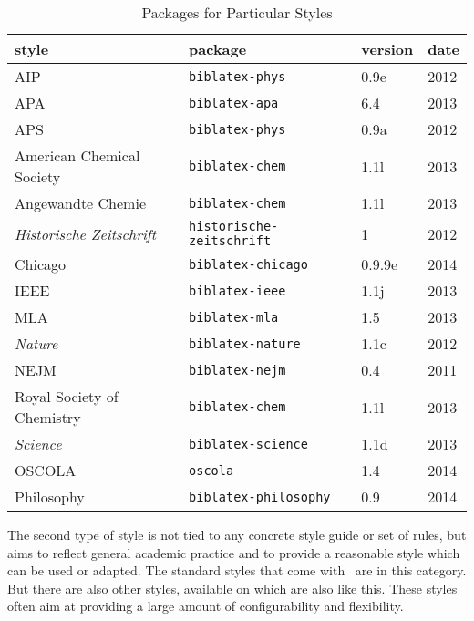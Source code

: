 \begin{table}
\caption{Packages for Particular Styles\label{ctan:bespoke}}
\small
\begin{tabular}{llll}
\toprule
\textsf{style} & \textsf{package} & \textsf{version} & \textsf{date}\\
\midrule AIP   & \texttt{biblatex-phys} & 0.9e & 2012 \\
APA            & \texttt{biblatex-apa} & 6.4 & 2013 \\
APS            & \texttt{biblatex-phys} & 0.9a & 2012 \\
American Chemical Society & \texttt{biblatex-chem} & 1.1l &
2013 \\
Angewandte Chemie & \texttt{biblatex-chem}           & 1.1l & 2013
\\
\textit{Historische Zeitschrift} &\texttt{historische-zeitschrift} & 1
& 2012 \\
Chicago          & \texttt{biblatex-chicago} & 0.9.9e & 2014 \\
IEEE             & \texttt{biblatex-ieee} & 1.1j & 2013 \\
MLA              & \texttt{biblatex-mla} & 1.5 & 2013 \\
\textit{Nature}  & \texttt{biblatex-nature} & 1.1c & 2012 \\
NEJM             & \texttt{biblatex-nejm} & 0.4 & 2011 \\
Royal Society of Chemistry & \texttt{biblatex-chem} & 1.1l & 2013 \\
\textit{Science} & \texttt{biblatex-science} & 1.1d & 2013 \\
OSCOLA           & \texttt{oscola} & 1.4 & 2014 \\
Philosophy       & \texttt{biblatex-philosophy} & 0.9 & 2014  \\
\bottomrule
\end{tabular}
\end{table}

The second type of style is not tied to any concrete style guide or
set of rules, but aims to reflect general academic practice and to
provide a reasonable style which can be used or
adapted. The standard styles that come with \biblatex\ are in this
category. But there are also other styles, available on
 which are also like this. These styles often aim at
providing a large amount of configurability and flexibility.

